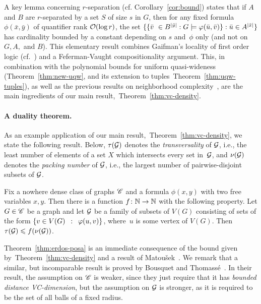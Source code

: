 A key lemma concerning $r$-separation (cf. Corollary~\ref{cor:bound}) states that if $A$
and $B$ are $r$-separated by a set $S$ of size $s$ in $G$,
then for any fixed formula $\phi(\bar x,\bar y)$
of quantifier rank $\Oof(\log r)$,
the set  $\{\{\tup v\ \in B^{|\bar y|} : G\models\phi(\tup u,\tup v)\} : \tup u\in A^{|\bar x|}\}$ has cardinality bounded by a constant depending on $s$ and~$\phi$ only (and not on $G,A,$ and $B$). 
This elementary result combines Gaifman's locality of first order logic (cf.~\cite{gaifman1982local}) and a Feferman-Vaught compositionality argument. This, in combination with the polynomial bounds 
for uniform quasi-wideness (Theorem~\ref{thm:new-uqw}, and its extension to tuples~Theorem~\ref{thm:uqw-tuples}), 
as well as the previous results on neighborhood complexity~\cite{drange2016kernelization,eickmeyer2016neighborhood}, are the main ingredients of our main result,~Theorem~\ref{thm:vc-density}.

\paragraph{A duality theorem.}
As an example application of our main result,~Theorem~\ref{thm:vc-density}, we state the following
 result. Below, $\tau(\cal G)$ denotes the \emph{transversality} of $\cal G$, i.e., the least number of elements of a set $X$ which intersects every set in~$\cal G$,
and $\nu(\cal G)$ denotes the \emph{packing number} of $\cal G$, i.e., the largest number of pairwise-disjoint subsets of $\cal G$.
 
\setcounter{ep}{\value{theorem}}
\begin{theorem}\label{thm:erdos-posa}
	Fix a nowhere dense class of graphs $\CCC$ and a 
	formula $\phi(x,y)$ with two free variables $x,y$.
	Then there is a function $f\from \N\to\N$ with the following property.
	Let $G\in \CCC$ be a graph and let $\cal G$
	be a family of subsets of $V(G)$ consisting of sets of the form $\setof{v\in V(G)}{\phi(u, v)}$, where~$u$ is some vertex of $V(G)$.
Then~$\tau({\cal G})\le f(\nu(\cal G))$.
\end{theorem}

Theorem~\ref{thm:erdos-posa} is an immediate consequence of the bound given by~Theorem~\ref{thm:vc-density} and a result of Matou{\v s}ek~\cite{Matousek:2004:BVI:1005787.1005789}.
%
We remark that a similar, but incomparable result
is proved by Bousquet and Thomass{\'e}~\cite{BousquetT15}.
In their result, the assumption on $\CCC$ is weaker, since they just require that it has \emph{bounded distance VC-dimension}, 
but the assumption on   $\cal G$ is stronger, as it is required to be the set of all balls of a fixed radius.





